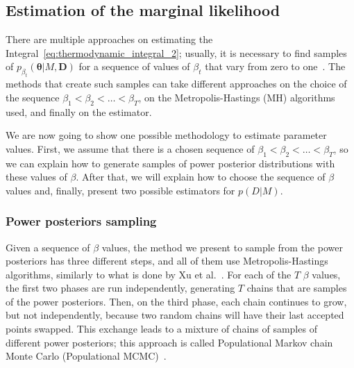 \subsection{Estimation of the marginal likelihood}
\label{sec:estimation_of_marginal_likelihood}
There are multiple approaches on estimating the 
Integral~\ref{eq:thermodynamic_integral_2}; usually, it is necessary to 
find samples of $p_{\beta_t} ({\bm \theta} | M, {\bm D})$ for a sequence 
of values of $\beta_t$ that vary from zero to one~\cite{Xura20, 
Vyshemirsky2007, Friel2008}. The methods that create such samples can 
take different approaches on the choice of the sequence $\beta_1 < 
\beta_2 < \ldots < \beta_T$, on the Metropolis-Hastings (MH) algorithms 
used, and finally on the estimator.

We are now going to show one possible methodology to estimate parameter 
values. First, we assume that there is a chosen sequence of $\beta_1 <
\beta_2 < \ldots < \beta_T$, so we can explain how to generate samples 
of power posterior distributions with these values of $\beta$. After
that, we will explain how to choose the sequence of $\beta$ values and,
finally, present two possible estimators for $p (D | M)$.

\subsubsection{Power posteriors sampling}
\label{sec:power_posteriors_sampling}
Given a sequence of $\beta$ values, the method we present to sample from 
the power posteriors has three different steps, and all of them use
Metropolis-Hastings algorithms, similarly to what is done by Xu et al.~\cite{Xura20}. For each of the $T$ $\beta$ values, the first two phases are
run independently, generating $T$ chains that are samples of the power 
posteriors. Then, on the third phase, each chain continues to grow, but
not independently, because two random chains will have their last 
accepted points swapped. This exchange leads to a mixture of chains of
samples of different power posteriors; this approach is called 
Populational Markov chain Monte Carlo (Populational 
MCMC)~\cite{Friel2008}.


